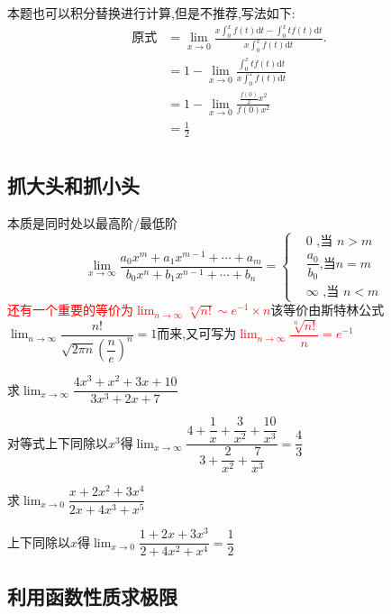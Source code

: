\documentclass[8pt a4paper, oneside, UTF8]{ctexbook}
\begin{document}
\begin{sloppypar}
\begin{note}
        本题也可以积分替换进行计算,但是不推荐,写法如下:
        \begin{align*}
             \text{原式} & = \lim_{x\to0}\frac{x\int_{0}^{x}f(t)\mathrm{d}t-\int_{0}^{x}tf\left(t\right)\mathrm{d}t}{x\!\int_{0}^{x}f(t)\mathrm{d}t}. & \\
             & = 1-\lim_{x\to0}\frac{\int_{0}^{x}tf\left(t\right)\mathrm{d}t}{x\int_{0}^{x}f\left(t\right)\mathrm{d}t} & \\
             & =1-\lim_{x\to0}\frac{\frac{f\left(0\right)}{2}x^{2}}{f\left(0\right)x^{2}} & \\
             & =\frac{1}{2} &\\
        \end{align*}
    \end{note}
    \subsection{抓大头和抓小头}
    本质是同时处以最高阶/最低阶
    $$
    \lim_{x\to\infty}\dfrac{a_0x^m+a_1x^{m-1}+\cdots+a_m}{b_0x^n+b_1x^{n-1}+\cdots+b_n}=\left.\left\{\begin{aligned}&0\text{ ,当 }n>m\\&\dfrac{a_0}{b_0}\text{,当}n=m\\&\infty\text{ ,当 }n<m\end{aligned}\right.\right.
    $$
    \textcolor{red}{还有一个重要的等价为$\lim_{n\to \infty}\sqrt[n]{n!}\sim e^{-1}\times n$}该等价由斯特林公式$\lim_{n\to\infty}\dfrac{n!}{\sqrt{2\pi n}\left(\dfrac ne\right)^n}=1$而来,又可写为\textcolor{red}{$\lim_{n\rightarrow\infty}\dfrac{\sqrt[n]{n!}}{n}=e^{-1}$}\label{stlgs1}
    \begin{problem}
        求$\lim_{x\to \infty}\dfrac{4x^3+x^2+3x+10}{3x^3+2x+7}$
    \end{problem}
    \begin{solution}
        对等式上下同除以$x^3$得$\lim_{x \to \infty}\dfrac{4+\dfrac1x+\dfrac3{x^2}+\dfrac{10}{x^3}}{3+\dfrac2{x^2}+\dfrac7{x^3}}=\dfrac{4}{3}$
    \end{solution}
    \begin{problem}
        求$\lim_{x\to 0}\dfrac{x+2x^{2}+3x^{4}}{2x+4x^{3}+x^{5}}$
    \end{problem}
    \begin{solution}
        上下同除以$x$得$\lim_{x\to 0}\dfrac{1+2x+3x^{3}}{2+4x^{2}+x^{4}}=\dfrac{1}{2}$
    \end{solution}

    \subsection{利用函数性质求极限}

\end{sloppypar}
\end{document}
